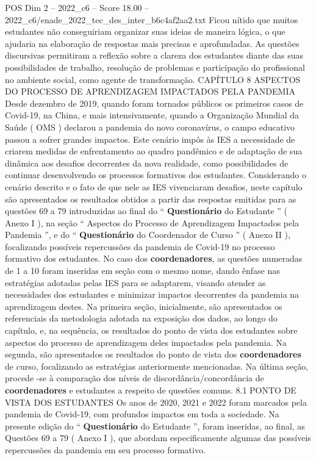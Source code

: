 \begin{textsample}{POS Dim 2 – 2022\_c6 – Score 18.00 – 2022\_c6/enade\_2022\_tec\_des\_inter\_b6c4af2aa2.txt}
Ficou nítido que muitos estudantes não conseguiriam organizar suas ideias de maneira lógica, o que ajudaria na elaboração de respostas mais precisas e aprofundadas.
As questões discursivas permitiram a reflexão sobre a clareza dos estudantes diante das suas possibilidades de trabalho, resolução de problemas e participação do profissional no ambiente social, como agente de transformação.
CAPÍTULO 8 ASPECTOS DO PROCESSO DE APRENDIZAGEM IMPACTADOS PELA PANDEMIA Desde dezembro de 2019, quando foram tornados públicos os primeiros casos de Covid-19, na China, e mais intensivamente, quando a Organização Mundial da Saúde ( OMS ) declarou a pandemia do novo coronavírus, o campo educativo passou a sofrer grandes impactos.
Este cenário impôs às IES a necessidade de criarem medidas de enfrentamento ao quadro pandêmico e de adaptação de sua dinâmica aos desafios decorrentes da nova realidade, como possibilidades de continuar desenvolvendo os processos formativos dos estudantes.
Considerando o cenário descrito e o fato de que nele as IES vivenciaram desafios, neste capítulo são apresentados os resultados obtidos a partir das respostas emitidas para as questões 69 a 79 introduzidas ao final do “ \textbf{Questionário} do Estudante ” ( Anexo I ), na seção “ Aspectos do Processo de Aprendizagem Impactados pela Pandemia ”, e do “ \textbf{Questionário} do Coordenador de Curso ” ( Anexo II ), focalizando possíveis repercussões da pandemia de Covid-19 no processo formativo dos estudantes.
No caso dos \textbf{coordenadores}, as questões numeradas de 1 a 10 foram inseridas em seção com o mesmo nome, dando ênfase nas estratégias adotadas pelas IES para se adaptarem, visando atender as necessidades dos estudantes e minimizar impactos decorrentes da pandemia na aprendizagem destes.
Na primeira seção, inicialmente, são apresentados os referenciais da metodologia adotada na exposição dos dados, ao longo do capítulo, e, na sequência, os resultados do ponto de vista dos estudantes sobre aspectos do processo de aprendizagem deles impactados pela pandemia.
Na segunda, são apresentados os resultados do ponto de vista dos \textbf{coordenadores} de curso, focalizando as estratégias anteriormente mencionadas.
Na última seção, procede -se à comparação dos níveis de discordância/concordância de \textbf{coordenadores} e estudantes a respeito de questões comuns. 8.1 PONTO DE VISTA DOS ESTUDANTES Os anos de 2020, 2021 e 2022 foram marcados pela pandemia de Covid-19, com profundos impactos em toda a sociedade.
Na presente edição do “ \textbf{Questionário} do Estudante ”, foram inseridas, ao final, as Questões 69 a 79 ( Anexo I ), que abordam especificamente algumas das possíveis repercussões da pandemia em seu processo formativo.

\end{textsample}
